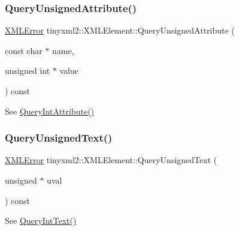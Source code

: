 \subsubsection{\texorpdfstring{Query\+Unsigned\+Attribute()}{QueryUnsignedAttribute()}}
{\footnotesize\ttfamily \hyperlink{namespacetinyxml2_a1fbf88509c3ac88c09117b1947414e08}{X\+M\+L\+Error} tinyxml2\+::\+X\+M\+L\+Element\+::\+Query\+Unsigned\+Attribute (\begin{DoxyParamCaption}\item[{const char $\ast$}]{name,  }\item[{unsigned int $\ast$}]{value }\end{DoxyParamCaption}) const\hspace{0.3cm}{\ttfamily [inline]}}



See \hyperlink{classtinyxml2_1_1_x_m_l_element_a8a78bc1187c1c45ad89f2690eab567b1}{Query\+Int\+Attribute()} 

\mbox{\label{classtinyxml2_1_1_x_m_l_element_a14d38aa4b5e18a46274a27425188a6a1}} 
\subsubsection{\texorpdfstring{Query\+Unsigned\+Text()}{QueryUnsignedText()}}
{\footnotesize\ttfamily \hyperlink{namespacetinyxml2_a1fbf88509c3ac88c09117b1947414e08}{X\+M\+L\+Error} tinyxml2\+::\+X\+M\+L\+Element\+::\+Query\+Unsigned\+Text (\begin{DoxyParamCaption}\item[{unsigned $\ast$}]{uval }\end{DoxyParamCaption}) const}



See \hyperlink{classtinyxml2_1_1_x_m_l_element_a926357996bef633cb736e1a558419632}{Query\+Int\+Text()} 

\mbox{\label{classtinyxml2_1_1_x_m_l_element_a11943abf2d0831548c3790dd5d9f119c}} 
